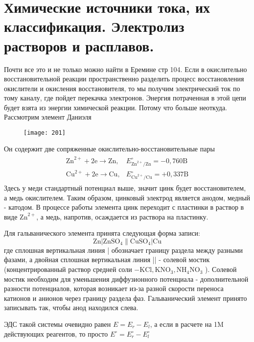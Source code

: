 \section{Химические источники тока, их классификация. Электролиз растворов и расплавов.}
	Почти все это и не только можно найти в Еремине стр 104.
	Если в окислительно восстановительной реакции пространственно разделить процесс восстановления окислители и окисления восстановителя, то мы получим электрический ток по тому каналу, где пойдет перекачка электронов. Энергия потраченная в этой цепи будет взята из энергии химической реакции. Потому что больше неоткуда.
	Рассмотрим элемент Даниэля
	\begin{figure}[H]
		\texttt{[image: 201]}
	\end{figure}
 	Он содержит две сопряженные окислительно-восстановительные пары 
 	\begin{align*}
 	\begin{array}{ll}
 	\mathrm{Zn}^{2+}+2 \mathrm{e} \rightarrow \mathrm{Zn}, & E_{\mathrm{Zn}^{2+} / \mathrm{Zn}}^{\circ}=-0,760 \mathrm{B} \\
 	\mathrm{Cu}^{2+}+2 \mathrm{e} \rightarrow \mathrm{Cu}, & E_{\mathrm{Cu}^{2+} / \mathrm{Cu}}^{\circ}=+0,337 \mathrm{B}
 	\end{array}	
 	\end{align*}
 	Здесь у меди стандартный потенциал выше, значит цинк будет восстановителем, а медь окислителем. Таким образом, цинковый электрод является анодом, медный - катодом. В процессе работы элемента цинк переходит с пластинки в раствор в виде $\mathrm{Zn}^{2+}$, а медь, напротив, осаждается из раствора на пластинку.
 	
 	Для гальванического элемента принята следующая форма записи:
 	$$
 	\mathrm{Zn}\left|\mathrm{ZnSO}_{4} \| \mathrm{CuSO}_{4}\right| \mathrm{Cu}
 	$$
 	где сплошная вертикальная линия | обозначает границу раздела между разными фазами, а двойная сплошная вертикальная линия || - солевой мостик (концентрированный раствор средней соли $-\mathrm{KCl}, \mathrm{KNO}_{3}, \mathrm{NH}_{4} \mathrm{NO}_{3}$ ). Солевой мостик необходим для уменьшения диффузионного потенциала - дополнительной разности потенциалов, которая возникает из-за разной скорости переноса катионов и анионов через границу раздела фаз. Гальванический элемент принято записывать так, чтобы анод находился слева.
 	
 	ЭДС такой системы очевидно равен $E = E_r - E_l$, а если в расчете на 1M действующих реагентов, то просто $E^\circ = E_r^\circ - E_l^\circ$
	
